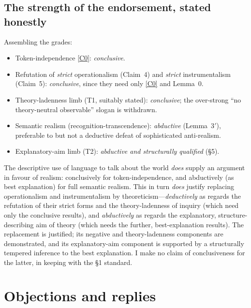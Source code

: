 \documentclass[12pt]{article}
\begin{document}
\subsection{The strength of the endorsement, stated honestly}

Assembling the grades:
\begin{itemize}[leftmargin=1.6em]
\item Token-independence \ref{C0}: \emph{conclusive}.
\item Refutation of \emph{strict} operationalism (Claim~4) and
\emph{strict} instrumentalism (Claim~5): \emph{conclusive}, since they
need only \ref{C0} and Lemma~0.
\item Theory-ladenness limb (T1, suitably stated): \emph{conclusive};
the over-strong ``no theory-neutral observable'' slogan is withdrawn.
\item Semantic realism (recognition-transcendence): \emph{abductive}
(Lemma~3$'$), preferable to but not a deductive defeat of sophisticated
anti-realism.
\item Explanatory-aim limb (T2): \emph{abductive and structurally
qualified} (\S5).
\end{itemize}

\begin{description}[leftmargin=1.6em,style=nextline]
\item[Final verdict.] The descriptive use of language to talk about the
world \emph{does} supply an argument in favour of realism: conclusively
for token-independence, and abductively (as best explanation) for full
semantic realism. This in turn \emph{does} justify replacing
operationalism and instrumentalism by theoreticism---\emph{deductively}
as regards the refutation of their strict forms and the theory-ladenness
of inquiry (which need only the conclusive results), and \emph{abductively}
as regards the explanatory, structure-describing aim of theory (which
needs the further, best-explanation results). The replacement is
justified; its negative and theory-ladenness components are demonstrated,
and its explanatory-aim component is supported by a structurally tempered
inference to the best explanation. I make no claim of conclusiveness for
the latter, in keeping with the \S1 standard.
\end{description}

\section{Objections and replies}
\end{document}
